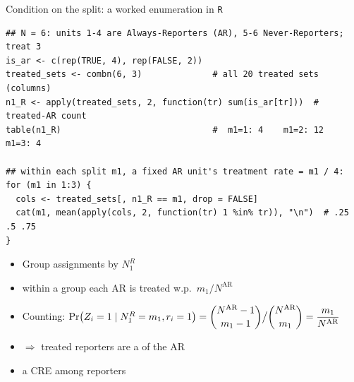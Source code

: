 \documentclass[table, xcolor = {dvipsnames}, 9pt]{beamer}
\theoremstyle{plain}
\newcommand{\mh}[1]{{\color{magenta}{#1}}}
\begin{document}
\begin{frame}[fragile]{Condition on the split: a worked enumeration in \texttt{R}}
\begin{lstlisting}[style=Rstyle, basicstyle=\ttfamily\scriptsize, frame=single]
## N = 6: units 1-4 are Always-Reporters (AR), 5-6 Never-Reporters; treat 3
is_ar <- c(rep(TRUE, 4), rep(FALSE, 2))
treated_sets <- combn(6, 3)              # all 20 treated sets (columns)
n1_R <- apply(treated_sets, 2, function(tr) sum(is_ar[tr]))  # treated-AR count
table(n1_R)                              #  m1=1: 4    m1=2: 12    m1=3: 4

## within each split m1, a fixed AR unit's treatment rate = m1 / 4:
for (m1 in 1:3) {
  cols <- treated_sets[, n1_R == m1, drop = FALSE]
  cat(m1, mean(apply(cols, 2, function(tr) 1 %in% tr)), "\n")  # .25 .5 .75
}
\end{lstlisting}
\vfill
\begin{itemize} \vfill
\item Group assignments by $N_1^R$ \vfill
\item[] within a group each AR is treated w.p.\ $m_1 / N^{\textrm{AR}}$ \vfill
\item[] Counting: $\Pr\!\left(Z_i = 1 \mid N_1^R = m_1, r_i = 1\right) = \dbinom{N^{\textrm{AR}} - 1}{m_1 - 1} \big/ \dbinom{N^{\textrm{AR}}}{m_1} = \dfrac{m_1}{N^{\textrm{AR}}}$ \vfill
\item[] $\Rightarrow$ treated reporters are a \mh{simple random sample} of the AR \vfill
\item[] a CRE among reporters \vfill
\end{itemize}
\end{frame}
\end{document}
